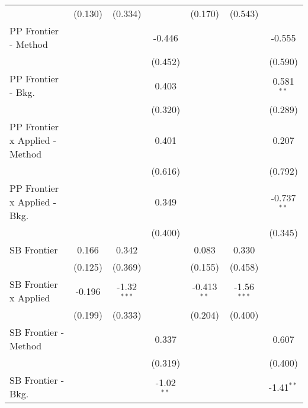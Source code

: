 \begin{tabular}{lcccccc}
                                  & (0.130)       & (0.334)       &                & (0.170)       & (0.543)       &   \\   
   PP Frontier - Method           &               &               & -0.446         &               &               & -0.555\\   
                                  &               &               & (0.452)        &               &               & (0.590)\\   
   PP Frontier - Bkg.             &               &               & 0.403          &               &               & 0.581$^{**}$\\   
                                  &               &               & (0.320)        &               &               & (0.289)\\   
   PP Frontier x Applied - Method &               &               & 0.401          &               &               & 0.207\\   
                                  &               &               & (0.616)        &               &               & (0.792)\\   
   PP Frontier x Applied - Bkg.   &               &               & 0.349          &               &               & -0.737$^{**}$\\   
                                  &               &               & (0.400)        &               &               & (0.345)\\   
   SB Frontier                    & 0.166         & 0.342         &                & 0.083         & 0.330         &   \\   
                                  & (0.125)       & (0.369)       &                & (0.155)       & (0.458)       &   \\   
   SB Frontier x Applied          & -0.196        & -1.32$^{***}$ &                & -0.413$^{**}$ & -1.56$^{***}$ &   \\   
                                  & (0.199)       & (0.333)       &                & (0.204)       & (0.400)       &   \\   
   SB Frontier - Method           &               &               & 0.337          &               &               & 0.607\\   
                                  &               &               & (0.319)        &               &               & (0.400)\\   
   SB Frontier - Bkg.             &               &               & -1.02$^{**}$   &               &               & -1.41$^{**}$\\   

\end{tabular}
